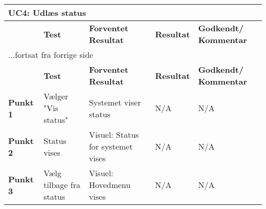 
\begin{center}
\begin{longtable}{|p{}|p{}|p{3cm}|p{3cm}|p{3cm}|} %
\hline
\multicolumn{5}{|l|}{\textbf{UC4: Udlæs status}} \\ \hline
\multicolumn{1}{|c|}{} &
\textbf{Test} &
\textbf{Forventet \newline Resultat} &
\textbf{Resultat} &
\textbf{Godkendt/ \newline Kommentar} \\ \hline 
\endfirsthead

\multicolumn{5}{l}{...fortsat fra forrige side} \\ \hline 
\multicolumn{1}{|c|}{} &
\textbf{Test} &
\textbf{Forventet \newline Resultat} &
\textbf{Resultat} &
\textbf{Godkendt/ \newline Kommentar} \\ \hline 
\endhead


\textbf{Punkt 1} &
Vælger "Vis status" &
Systemet viser status &
N/A &
N/A \\\hline
\textbf{Punkt 2} &
Status vises &
Visuel: Status for systemet vises &
N/A &
N/A \\\hline
\textbf{Punkt 3} &
Vælg tilbage fra status &
Visuel: Hovedmenu vises &
N/A &
N/A \\\hline
	\end{longtable}
	\label{ATUC4} 
\end{center}